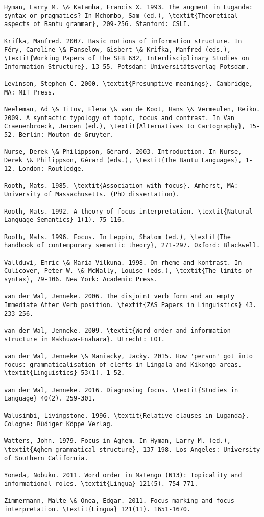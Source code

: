 \documentclass[output=paper]{langsci/langscibook}
\begin{document}
\begin{verbatim}
Hyman, Larry M. \& Katamba, Francis X. 1993. The augment in Luganda: syntax or pragmatics? In Mchombo, Sam (ed.), \textit{Theoretical aspects of Bantu grammar}, 209-256. Stanford: CSLI.

Krifka, Manfred. 2007. Basic notions of information structure. In Féry, Caroline \& Fanselow, Gisbert \& Krifka, Manfred (eds.), \textit{Working Papers of the SFB 632, Interdisciplinary Studies on Information Structure}, 13-55. Potsdam: Universitätsverlag Potsdam.

Levinson, Stephen C. 2000. \textit{Presumptive meanings}. Cambridge, MA: MIT Press.

Neeleman, Ad \& Titov, Elena \& van de Koot, Hans \& Vermeulen, Reiko. 2009. A syntactic typology of topic, focus and contrast. In Van Craenenbroeck, Jeroen (ed.), \textit{Alternatives to Cartography}, 15-52. Berlin: Mouton de Gruyter.

Nurse, Derek \& Philippson, Gérard. 2003. Introduction. In Nurse, Derek \& Philippson, Gérard (eds.), \textit{The Bantu Languages}, 1-12. London: Routledge.

Rooth, Mats. 1985. \textit{Association with focus}. Amherst, MA: University of Massachusetts. (PhD dissertation).

Rooth, Mats. 1992. A theory of focus interpretation. \textit{Natural Language Semantics} 1(1). 75-116.

Rooth, Mats. 1996. Focus. In Leppin, Shalom (ed.), \textit{The handbook of contemporary semantic theory}, 271-297. Oxford: Blackwell.

Vallduví, Enric \& Maria Vilkuna. 1998. On rheme and kontrast. In Culicover, Peter W. \& McNally, Louise (eds.), \textit{The limits of syntax}, 79-106. New York: Academic Press.

van der Wal, Jenneke. 2006. The disjoint verb form and an empty Immediate After Verb position. \textit{ZAS Papers in Linguistics} 43. 233-256.

van der Wal, Jenneke. 2009. \textit{Word order and information structure in Makhuwa-Enahara}. Utrecht: LOT.

van der Wal, Jenneke \& Maniacky, Jacky. 2015. How 'person' got into focus: grammaticalisation of clefts in Lingala and Kikongo areas. \textit{Linguistics} 53(1). 1-52.

van der Wal, Jenneke. 2016. Diagnosing focus. \textit{Studies in Language} 40(2). 259-301.

Walusimbi, Livingstone. 1996. \textit{Relative clauses in Luganda}. Cologne: Rüdiger Köppe Verlag.

Watters, John. 1979. Focus in Aghem. In Hyman, Larry M. (ed.), \textit{Aghem grammatical structure}, 137-198. Los Angeles: University of Southern California.

Yoneda, Nobuko. 2011. Word order in Matengo (N13): Topicality and informational roles. \textit{Lingua} 121(5). 754-771.

Zimmermann, Malte \& Onea, Edgar. 2011. Focus marking and focus interpretation. \textit{Lingua} 121(11). 1651-1670.


\end{verbatim}
 

\printbibliography[heading=subbibliography,notkeyword=this]
\end{document}
